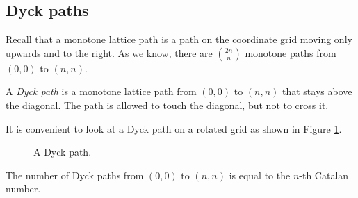 \begin{page}

\subsection{Dyck paths}
Recall that a monotone lattice path is a path on the coordinate grid moving only upwards and to the right.
As we know, there are $\binom{2n}{n}$ monotone paths from $(0,0)$ to $(n,n)$.


\end{page}

\begin{page}

\begin{dfn}
A \emph{Dyck path} is a monotone lattice path from $(0,0)$ to $(n,n)$ that stays above the diagonal.
The path is allowed to touch the diagonal, but not to cross it.
\end{dfn}

\end{page}

\begin{page}


It is convenient to look at a Dyck path on a rotated grid as shown in Figure \ref{fig:DyckPath}.

\begin{figure}[ht]
\begin{center}

\end{center}
\caption{A Dyck path.}
\label{fig:DyckPath}
\end{figure}



\end{page}

\begin{page}

\begin{thm}
The number of Dyck paths from $(0,0)$ to $(n,n)$ is equal to the $n$-th Catalan number.
\end{thm}

\end{page}

